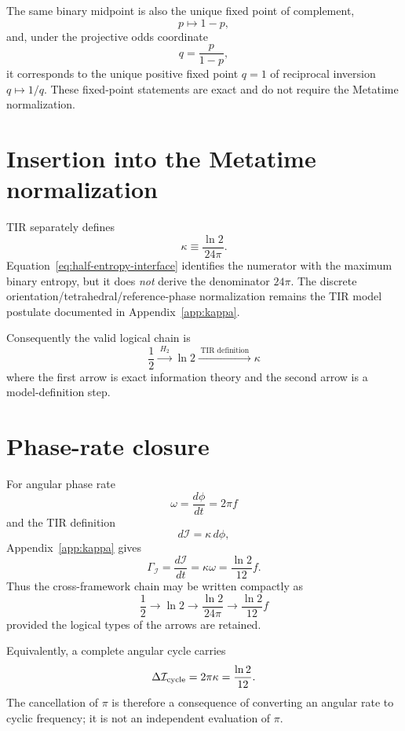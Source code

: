 The same binary midpoint is also the unique fixed point of complement,
\[
p\mapsto1-p,
\]
and, under the projective odds coordinate
\[
q=\frac{p}{1-p},
\]
it corresponds to the unique positive fixed point $q=1$ of reciprocal inversion
$q\mapsto1/q$.  These fixed-point statements are exact and do not require the
Metatime normalization.

\section{Insertion into the Metatime normalization}

TIR separately defines
\begin{equation}
\kappa\equiv\frac{\ln2}{24\pi}.
\label{eq:half-interface-kappa}
\end{equation}
Equation~\eqref{eq:half-entropy-interface} identifies the numerator with the
maximum binary entropy, but it does \emph{not} derive the denominator $24\pi$.
The discrete orientation/tetrahedral/reference-phase normalization remains the
TIR model postulate documented in Appendix~\ref{app:kappa}.

Consequently the valid logical chain is
\begin{equation}
\boxed{
\frac12
\xrightarrow{\;H_2\;}
\ln2
\xrightarrow{\;\text{TIR definition}\;}
\kappa
}
\label{eq:half-to-kappa-chain}
\end{equation}
where the first arrow is exact information theory and the second arrow is a
model-definition step.

\section{Phase-rate closure}

For angular phase rate
\[
\omega=\frac{d\phi}{dt}=2\pi f
\]
and the TIR definition
\[
d\mathcal I=\kappa\,d\phi,
\]
Appendix~\ref{app:kappa} gives
\begin{equation}
\boxed{
\Gamma_{\mathcal I}
=\frac{d\mathcal I}{dt}
=\kappa\omega
=\frac{\ln2}{12}f
}.
\label{eq:half-interface-phase-rate}
\end{equation}
Thus the cross-framework chain may be written compactly as
\begin{equation}
\boxed{
\frac12
\longrightarrow
\ln2
\longrightarrow
\frac{\ln2}{24\pi}
\longrightarrow
\frac{\ln2}{12}f
}
\end{equation}
provided the logical types of the arrows are retained.

Equivalently, a complete angular cycle carries
\[
\Delta\mathcal I_{\rm cycle}=2\pi\kappa=\frac{\ln2}{12}.
\]
The cancellation of $\pi$ is therefore a consequence of converting an angular
rate to cyclic frequency; it is not an independent evaluation of $\pi$.

